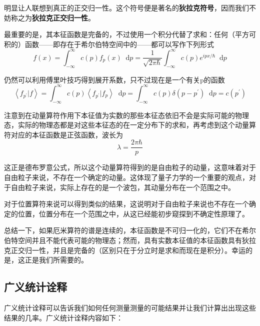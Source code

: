\documentclass[UTF8]{ctexart}
\begin{document}
\noindent 明显让人联想到真正的正交归一性。这个符号便是著名的\textbf{狄拉克符号}，因而我们不妨称之为\textbf{狄拉克正交归一性}。

    最重要的是，其本征函数是完备的，不过使用一个积分代替了求和：任何（平方可积的）函数——即存在于希尔伯特空间中的——都可以写作下列形式
    \begin{equation}
        f(x)=\int_{-\infty}^{\infty} c(p) f_{p}(x) \mathop{}\!\mathrm{d}  p=\frac{1}{\sqrt{2 \pi \hbar}} \int_{-\infty}^{\infty} c(p) e^{i p x / \hbar} \mathop{}\!\mathrm{d}  p
        \end{equation}

    仍然可以利用傅里叶技巧得到展开系数，只不过现在是一个有关p的函数
    \begin{equation}
        \left\langle f_{p^{\prime}} | f\right\rangle=\int_{-\infty}^{\infty} c(p)\left\langle f_{p^{\prime}} | f_{p}\right\rangle \mathop{}\!\mathrm{d}  p=\int_{-\infty}^{\infty} c(p) \delta\left(p-p^{\prime}\right) \mathop{}\!\mathrm{d}  p=c\left(p^{\prime}\right)
        \end{equation}

    注意到在动量算符作用下本征值为实数的那些本征态依旧不会是实际可能的物理态，实际的物理态都是对这些本征态的在一定分布下的求和，再考虑到这个动量算符对应的本征函数是正弦函数，波长为
    \begin{equation}
        \lambda = \frac{2 \pi \hbar}{p}
    \end{equation}

\noindent 这正是德布罗意公式，所以这个动量算符得到的是自由粒子的动量，这意味着对于自由粒子来说，不存在一个确定的动量。这体现了量子力学的一个重要的观点，对于自由粒子来说，实际上存在的是一个波包，其动量分布在一个范围之中。

    对于位置算符来说可以得到类似的结果，这说明对于自由粒子来说也不存在一个确定的位置，位置分布在一个范围之中，从这已经能初步窥探到不确定性原理了。

    总结一下，如果厄米算符的谱是连续的，本征函数是不可归一化的，它们不在希尔伯特空间并且不能代表可能的物理态；然而，具有实数本征值的本征函数具有狄拉克正交归一性，并且是完备的（区别只在于分立时是求和而现在是积分）。幸运的是，这正是我们所需要的。

    \subsection{广义统计诠释}
    广义统计诠释可以告诉我们如何任何测量测量的可能结果并让我们计算出出现这些结果的几率。广义统计诠释内容如下：
\end{document}
